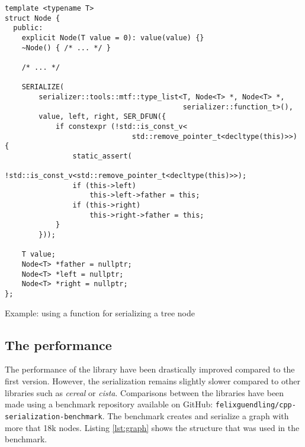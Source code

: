 \begin{listing}[ht!]
\begin{verbatim}
template <typename T>
struct Node {
  public:
    explicit Node(T value = 0): value(value) {}
    ~Node() { /* ... */ }

    /* ... */

    SERIALIZE(
        serializer::tools::mtf::type_list<T, Node<T> *, Node<T> *,
                                          serializer::function_t>(),
        value, left, right, SER_DFUN({
            if constexpr (!std::is_const_v<
                              std::remove_pointer_t<decltype(this)>>) {
                static_assert(
                    !std::is_const_v<std::remove_pointer_t<decltype(this)>>);
                if (this->left)
                    this->left->father = this;
                if (this->right)
                    this->right->father = this;
            }
        }));

    T value;
    Node<T> *father = nullptr;
    Node<T> *left = nullptr;
    Node<T> *right = nullptr;
};
\end{verbatim}
\caption{Example: using a function for serializing a tree node}
\label{lst:treenode}
\end{listing}

\clearpage{}
\subsection{The performance}

The performance of the library have been drastically improved compared to the
first version. However, the serialization remains slightly slower compared to
other libraries such as \textit{cereal} or \textit{cista}. Comparisons between
the libraries have been made using a benchmark repository available on GitHub:
\texttt{felixguendling/cpp-serialization-benchmark}. The benchmark creates and
serialize a graph with more that 18k nodes. Listing \ref{lst:graph} shows the
structure that was used in the benchmark.

